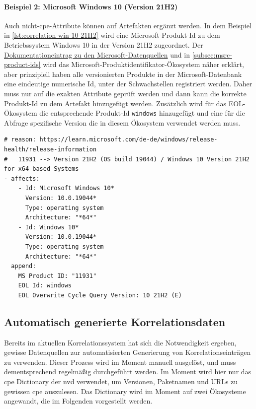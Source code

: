 \paragraph{Beispiel 2: Microsoft Windows 10 (Version 21H2)}
Auch nicht-\acrshort{cpe}-Attribute können auf Artefakten ergänzt werden.
In dem Beispiel in \autoref{lst:correlation-win-10-21H2} wird eine Microsoft-Produkt-Id zu dem Betriebssystem Windows 10 in der Version 21H2 zugeordnet.
Der \href{https://github.com/org-metaeffekt/metaeffekt-documentation/blob/bd184b2889d5421b5a71dcd26c1ac0ffc63d07e7/metaeffekt-vulnerability-management/data-mirror/msrc/understanding-data.md}{Dokumentationeintrag zu den Microsoft-Datenquellen} und in \autoref{subsec:msrc-product-ids} wird das Microsoft-Produktidentifikator-Ökosystem näher erklärt, aber prinzipiell haben alle versionierten Produkte in der Microsoft-Datenbank eine eindeutige numerische Id, unter der Schwachstellen registriert werden.
Daher muss nur auf die exakten Attribute geprüft werden und dann kann die korrekte Produkt-Id zu dem Artefakt hinzugefügt werden.
Zusätzlich wird für das EOL-Ökosystem die entsprechende Produkt-Id \texttt{windows} hinzugefügt und eine für die Abfrage spezifische Version die in diesem Ökosystem verwendet werden muss.

\begin{lstlisting}[style=yaml,caption={Korrelationseintrag für Windows 10},label={lst:correlation-win-10-21H2}]
# reason: https://learn.microsoft.com/de-de/windows/release-health/release-information
#   11931 --> Version 21H2 (OS build 19044) / Windows 10 Version 21H2 for x64-based Systems
- affects:
    - Id: Microsoft Windows 10*
      Version: 10.0.19044*
      Type: operating system
      Architecture: "*64*"
    - Id: Windows 10*
      Version: 10.0.19044*
      Type: operating system
      Architecture: "*64*"
  append:
    MS Product ID: "11931"
    EOL Id: windows
    EOL Overwrite Cycle Query Version: 10 21H2 (E)
\end{lstlisting}

\subsection{Automatisch generierte Korrelationsdaten}\label{subsec:old-generated-correlation-data}

Bereits im aktuellen Korrelationssystem hat sich die Notwendigkeit ergeben, gewisse Datenquellen zur automatisierten Generierung von Korrelationseinträgen zu verwenden.
Dieser Prozess wird im Moment manuell ausgelöst, und muss dementsprechend regelmäßig durchgeführt werden.
Im Moment wird hier nur das \acrshort{cpe} Dictionary der \acrshort{nvd} verwendet, um Versionen, Paketnamen und URLs zu gewissen \acrshort{cpe} auszulesen.
Das Dictionary wird im Moment auf zwei Ökosysteme angewandt, die im Folgenden vorgestellt werden.

